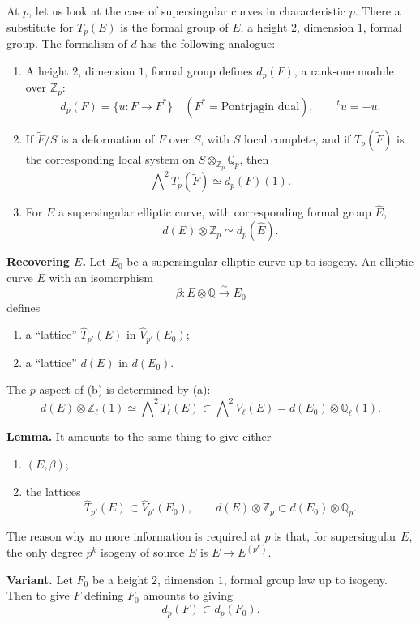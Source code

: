 \documentclass[11pt]{article}
\newcommand{\Q}{\mathbb{Q}}
\newcommand{\Qp}{\mathbb{Q}_{p}}
\newcommand{\Zp}{\mathbb{Z}_{p}}
\newcommand{\Ql}{\mathbb{Q}_{\ell}}
\newcommand{\Zl}{\mathbb{Z}_{\ell}}
\newcommand{\wt}{\widetilde}
\newcommand{\wh}{\widehat}
\begin{document}
At \(p\), let us look at the case of supersingular curves in characteristic \(p\). There a substitute for \(T_p(E)\) is the formal group of \(E\), a height \(2\), dimension \(1\), formal group. The formalism of \(d\) has the following analogue:
\begin{enumerate}[label=(\alph*)]
\item A height \(2\), dimension \(1\), formal group defines \(d_p(F)\), a rank-one module over \(\Zp\):
\[
d_p(F)=\{u:F\to F^*\}\quad(F^*=\text{Pontrjagin dual}),\qquad {}^t u=-u .
\]
\item If \(\wt F/S\) is a deformation of \(F\) over \(S\), with \(S\) local complete, and if \(T_p(\wt F)\) is the corresponding local system on \(S\otimes_{\Zp}\Qp\), then
\[
\bigwedge\nolimits^2 T_p(\wt F)\simeq d_p(F)(1).
\]
\item For \(E\) a supersingular elliptic curve, with corresponding formal group \(\wh E\),
\[
d(E)\otimes\Zp\simeq d_p(\wh E).
\]
\end{enumerate}

\textbf{Recovering \(E\).} Let \(E_0\) be a supersingular elliptic curve up to isogeny. An elliptic curve \(E\) with an isomorphism
\[
\beta:E\otimes\Q\xrightarrow{\sim}E_0
\]
defines
\begin{enumerate}[label=(\alph*)]
\item a ``lattice'' \(\wh T_{p'}(E)\) in \(\wh V_{p'}(E_0)\);
\item a ``lattice'' \(d(E)\) in \(d(E_0)\).
\end{enumerate}
The \(p\)-aspect of (b) is determined by (a):
\[
d(E)\otimes\Zl(1)\simeq \bigwedge\nolimits^2T_{\ell}(E)
\subset \bigwedge\nolimits^2V_{\ell}(E)=d(E_0)\otimes\Ql(1).
\]

\textbf{Lemma.} It amounts to the same thing to give either
\begin{enumerate}[label=(\alph*)]
\item \((E,\beta)\);
\item the lattices
\[
\wh T_{p'}(E)\subset\wh V_{p'}(E_0),\qquad
d(E)\otimes\Zp\subset d(E_0)\otimes\Qp .
\]
\end{enumerate}
The reason why no more information is required at \(p\) is that, for supersingular \(E\), the only degree \(p^k\) isogeny of source \(E\) is \(E\to E^{(p^k)}\).

\textbf{Variant.} Let \(F_0\) be a height \(2\), dimension \(1\), formal group law up to isogeny. Then to give \(F\) defining \(F_0\) amounts to giving
\[
d_p(F)\subset d_p(F_0).
\]
\end{document}
